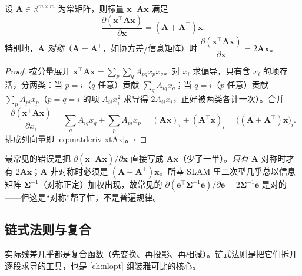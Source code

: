 \begin{proposition}\label{prop:matderiv-xtAx}
设 $\mathbf{A}\in\mathbb{R}^{m\times m}$ 为常矩阵，则标量 $\mathbf{x}^\top\mathbf{A}\mathbf{x}$ 满足\cite{petersen2012cookbook}
\begin{equation}
  \frac{\partial(\mathbf{x}^\top\mathbf{A}\mathbf{x})}{\partial\mathbf{x}}=(\mathbf{A}+\mathbf{A}^\top)\mathbf{x}.
  \label{eq:matderiv-xtAx}
\end{equation}
特别地，$\mathbf{A}$ \emph{对称}（$\mathbf{A}=\mathbf{A}^\top$，如协方差/信息矩阵）时 $\dfrac{\partial(\mathbf{x}^\top\mathbf{A}\mathbf{x})}{\partial\mathbf{x}}=2\mathbf{A}\mathbf{x}$。
\end{proposition}
\begin{proof}
按分量展开 $\mathbf{x}^\top\mathbf{A}\mathbf{x}=\sum_{p}\sum_{q}A_{pq}x_p x_q$。对 $x_i$ 求偏导，只有含 $x_i$ 的项存活，分两类：当 $p=i$（$q$ 任意）贡献 $\sum_q A_{iq}x_q$；当 $q=i$（$p$ 任意）贡献 $\sum_p A_{pi}x_p$（$p=q=i$ 的项 $A_{ii}x_i^2$ 求导得 $2A_{ii}x_i$，正好被两类各计一次）。合并
\begin{equation*}
  \frac{\partial(\mathbf{x}^\top\mathbf{A}\mathbf{x})}{\partial x_i}
  =\sum_q A_{iq}x_q+\sum_p A_{pi}x_p
  =(\mathbf{A}\mathbf{x})_i+(\mathbf{A}^\top\mathbf{x})_i
  =\big((\mathbf{A}+\mathbf{A}^\top)\mathbf{x}\big)_i .
\end{equation*}
排成列向量即 \cref{eq:matderiv-xtAx}。\hfill$\square$
\end{proof}

\begin{pitfall}
最常见的错误是把 $\partial(\mathbf{x}^\top\mathbf{A}\mathbf{x})/\partial\mathbf{x}$ 直接写成 $\mathbf{A}\mathbf{x}$（少了一半）。\emph{只有} $\mathbf{A}$ 对称时才有 $2\mathbf{A}\mathbf{x}$；$\mathbf{A}$ 非对称时必须是 $(\mathbf{A}+\mathbf{A}^\top)\mathbf{x}$。所幸 SLAM 里二次型几乎总以信息矩阵 $\boldsymbol{\Sigma}^{-1}$（对称正定）加权出现，故常见的 $\partial(\mathbf{e}^\top\boldsymbol{\Sigma}^{-1}\mathbf{e})/\partial\mathbf{e}=2\boldsymbol{\Sigma}^{-1}\mathbf{e}$ 是对的——但这是“对称”帮了忙，不是普遍规律。
\end{pitfall}

\subsection{链式法则与复合}
\label{sec:matderiv-chain}

实际残差几乎都是复合函数（先变换、再投影、再相减）。链式法则是把它们拆开逐段求导的工具，也是 \cref{ch:nlopt} 组装雅可比的核心。

